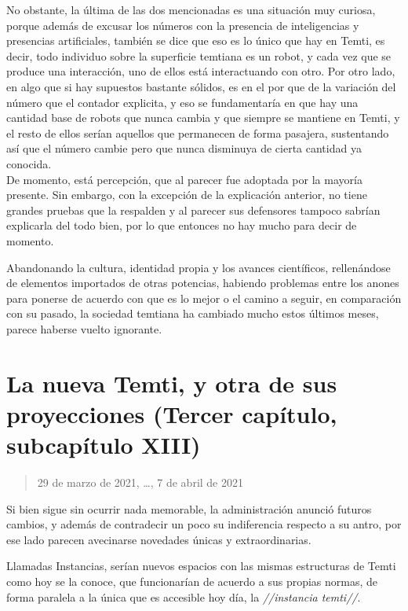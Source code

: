 \documentclass[
  spanish,
]{book}
\begin{document}
No obstante, la última de las dos mencionadas es una situación muy curiosa, porque además de excusar los números con la presencia de inteligencias y presencias artificiales, también se dice que eso es lo único que hay en Temti, es decir, todo individuo sobre la superficie temtiana es un robot, y cada vez que se produce una interacción, uno de ellos está interactuando con otro. Por otro lado, en algo que si hay supuestos bastante sólidos, es en el por que de la variación del número que el contador explicita, y eso se fundamentaría en que hay una cantidad base de robots que nunca cambia y que siempre se mantiene en Temti, y el resto de ellos serían aquellos que permanecen de forma pasajera, sustentando así que el número cambie pero que nunca disminuya de cierta cantidad ya conocida.\\
De momento, está percepción, que al parecer fue adoptada por la mayoría presente. Sin embargo, con la excepción de la explicación anterior, no tiene grandes pruebas que la respalden y al parecer sus defensores tampoco sabrían explicarla del todo bien, por lo que entonces no hay mucho para decir de momento.

Abandonando la cultura, identidad propia y los avances científicos, rellenándose de elementos importados de otras potencias, habiendo problemas entre los anones para ponerse de acuerdo con que es lo mejor o el camino a seguir, en comparación con su pasado, la sociedad temtiana ha cambiado mucho estos últimos meses, parece haberse vuelto ignorante.

\hypertarget{la-nueva-temti-y-otra-de-sus-proyecciones-tercer-capuxedtulo-subcapuxedtulo-xiii}{%
\section{La nueva Temti, y otra de sus proyecciones (Tercer capítulo, subcapítulo XIII)}\label{la-nueva-temti-y-otra-de-sus-proyecciones-tercer-capuxedtulo-subcapuxedtulo-xiii}}

\begin{quote}
29 de marzo de 2021, \ldots, 7 de abril de 2021
\end{quote}

Si bien sigue sin ocurrir nada memorable, la administración anunció futuros cambios, y además de contradecir un poco su indiferencia respecto a su antro, por ese lado parecen avecinarse novedades únicas y extraordinarias.

Llamadas Instancias, serían nuevos espacios con las mismas estructuras de Temti como hoy se la conoce, que funcionarían de acuerdo a sus propias normas, de forma paralela a la única que es accesible hoy día, la \emph{//instancia temti//}.
\end{document}
